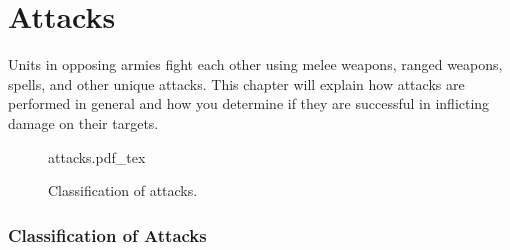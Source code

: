 
\part{Attacks}
\label{attacks}

Units in opposing armies fight each other using melee weapons, ranged weapons, spells, and other unique attacks. This chapter will explain how attacks are performed in general and how you determine if they are successful in inflicting damage on their targets.

\newcommand{\figATTAttacks}{Attacks}
\newcommand{\figATTMeleeAttacks}{%
	\begin{minipage}{0.17\unitlength}\begin{center}%
		Melee Attacks%
	\end{center}\end{minipage}%
}
\newcommand{\figATTRangedAttacks}{%
	\begin{minipage}{0.17\unitlength}\begin{center}%
		Ranged Attacks%
	\end{center}\end{minipage}%
}
\newcommand{\figATTCCAttacks}{%
	\begin{minipage}{0.2\unitlength}\begin{center}%
		Close Combat Attacks%
	\end{center}\end{minipage}%
}
\newcommand{\figATTSpeMeleeAttacks}{%
	\begin{minipage}{0.2\unitlength}\begin{center}%
		Special Attacks%
	\end{center}\end{minipage}%
}
\newcommand{\figATTShootingAttacks}{%
	\begin{minipage}{0.15\unitlength}\begin{center}%
		Shooting Attacks%
	\end{center}\end{minipage}%
}
\newcommand{\figATTOthers}{Others}

\begin{figure}[!htbp]
	\centering
	\def\svgwidth{0.8\textwidth}
	{attacks.pdf_tex}
	\caption{Classification of attacks.}
	\label{figure/attacks}
\end{figure}

\RBbmc

\section{Classification of Attacks}

